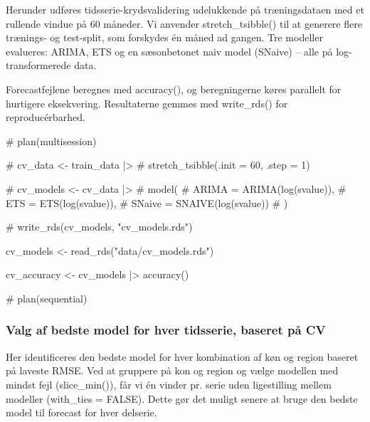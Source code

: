 \documentclass[
]{article}
\newenvironment{Shaded}{\begin{snugshade}}{\end{snugshade}}
\newcommand{\CommentTok}[1]{\textcolor[rgb]{0.37,0.37,0.37}{#1}}
\newcommand{\FunctionTok}[1]{\textcolor[rgb]{0.28,0.35,0.67}{#1}}
\newcommand{\NormalTok}[1]{\textcolor[rgb]{0.00,0.23,0.31}{#1}}
\newcommand{\OtherTok}[1]{\textcolor[rgb]{0.00,0.23,0.31}{#1}}
\newcommand{\SpecialCharTok}[1]{\textcolor[rgb]{0.37,0.37,0.37}{#1}}
\newcommand{\StringTok}[1]{\textcolor[rgb]{0.13,0.47,0.30}{#1}}
\begin{document}
Herunder udføres tidsserie-krydsvalidering udelukkende på træningsdataen
med et rullende vindue på 60 måneder. Vi anvender stretch\_tsibble() til
at generere flere trænings- og test-split, som forskydes én måned ad
gangen. Tre modeller evalueres: ARIMA, ETS og en sæsonbetonet naiv model
(SNaive) -- alle på log-transformerede data.

Forecastfejlene beregnes med accuracy(), og beregningerne køres
parallelt for hurtigere eksekvering. Resultaterne gemmes med
write\_rds() for reproducérbarhed.

\begin{Shaded}
\begin{Highlighting}[]
\CommentTok{\# plan(multisession)}

\CommentTok{\# cv\_data \textless{}{-} train\_data |\textgreater{}}
\CommentTok{\#   stretch\_tsibble(.init = 60, .step = 1)}

\CommentTok{\# cv\_models \textless{}{-} cv\_data |\textgreater{}}
\CommentTok{\#   model(}
\CommentTok{\#     ARIMA  = ARIMA(log(svalue)),}
\CommentTok{\#     ETS    = ETS(log(svalue)),}
\CommentTok{\#     SNaive = SNAIVE(log(svalue))}
\CommentTok{\#   )}

\CommentTok{\# write\_rds(cv\_models, "cv\_models.rds")}

\NormalTok{cv\_models }\OtherTok{\textless{}{-}} \FunctionTok{read\_rds}\NormalTok{(}\StringTok{"data/cv\_models.rds"}\NormalTok{)}

\NormalTok{cv\_accuracy }\OtherTok{\textless{}{-}}\NormalTok{ cv\_models }\SpecialCharTok{|\textgreater{}}
  \FunctionTok{accuracy}\NormalTok{()}

\CommentTok{\# plan(sequential)}
\end{Highlighting}
\end{Shaded}

\subsubsection{Valg af bedste model for hver tidsserie, baseret på
CV}\label{valg-af-bedste-model-for-hver-tidsserie-baseret-puxe5-cv}

Her identificeres den bedste model for hver kombination af køn og region
baseret på laveste RMSE. Ved at gruppere på kon og region og vælge
modellen med mindst fejl (slice\_min()), får vi én vinder pr. serie uden
ligestilling mellem modeller (with\_ties = FALSE). Dette gør det muligt
senere at bruge den bedste model til forecast for hver delserie.
\end{document}
